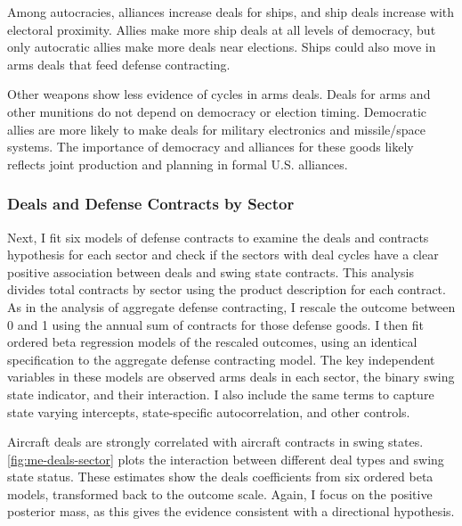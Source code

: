 \documentclass[12pt]{article}
\begin{document}
Among autocracies, alliances increase deals for ships, and ship deals increase with electoral proximity. 
Allies make more ship deals at all levels of democracy, but only autocratic allies make more deals near elections. 
Ships could also move in arms deals that feed defense contracting. 


Other weapons show less evidence of cycles in arms deals. 
Deals for arms and other munitions do not depend on democracy or election timing. 
Democratic allies are more likely to make deals for military electronics and missile/space systems. 
The importance of democracy and alliances for these goods likely reflects joint production and planning in formal U.S. alliances. 



\subsubsection{Deals and Defense Contracts by Sector}


Next, I fit six models of defense contracts to examine the deals and contracts hypothesis for each sector and check if the sectors with deal cycles have a clear positive association between deals and swing state contracts. 
This analysis divides total contracts by sector using the product description for each contract. 
As in the analysis of aggregate defense contracting, I rescale the outcome between 0 and 1 using the annual sum of contracts for those defense goods. 
I then fit ordered beta regression models of the rescaled outcomes, using an identical specification to the aggregate defense contracting model.
The key independent variables in these models are observed arms deals in each sector, the binary swing state indicator, and their interaction. 
I also include the same terms to capture state varying intercepts, state-specific autocorrelation, and other controls. 


Aircraft deals are strongly correlated with aircraft contracts in swing states. 
\autoref{fig:me-deals-sector} plots the interaction between different deal types and swing state status.  
These estimates show the deals coefficients from six ordered beta models, transformed back to the outcome scale. 
Again, I focus on the positive posterior mass, as this gives the evidence consistent with a directional hypothesis.
\end{document}
